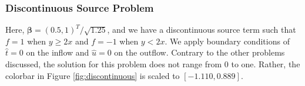 \documentclass[letterpaper]{article}
\def\bbeta{\boldsymbol\beta}
\begin{document}
%

\subsubsection{Discontinuous Source Problem}
Here, $\bbeta=(0.5,1)^T/\sqrt{1.25}$, and we have a discontinuous source term
such that $f=1$ when $y\ge2x$ and $f=-1$ when $y<2x$. We apply boundary
conditions of $\hat t=0$ on the inflow and $\hat u=0$ on the outflow. Contrary
to the other problems discussed, the solution for this problem does not range
from 0 to one. Rather, the colorbar in Figure \ref{fig:discontinuous} is
scaled to  $[-1.110,0.889]$.
\end{document}
